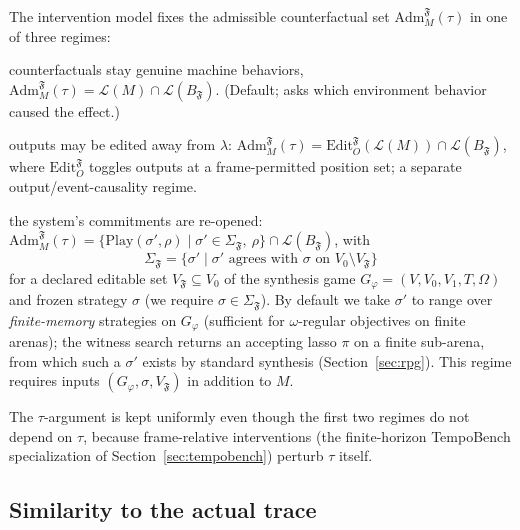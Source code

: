 \documentclass[11pt]{article}
\theoremstyle{remark}
\newcommand{\Lang}{\mathcal{L}}
\newcommand{\Frame}{\mathfrak{F}}
\newcommand{\Adm}{\mathrm{Adm}}
\begin{document}
The intervention model fixes the admissible counterfactual set
\(\Adm_M^{\Frame}(\tau)\) in one of three regimes:
\begin{description}[leftmargin=2.2cm,style=nextline]
  \item[Input-only] counterfactuals stay genuine machine behaviors,
        \(\Adm_M^{\Frame}(\tau)=\Lang(M)\cap\Lang(B_{\Frame})\). (Default; asks
        which environment behavior caused the effect.)
  \item[Output-intervention] outputs may be edited away from \(\lambda\):
        \(\Adm_M^{\Frame}(\tau)=\mathrm{Edit}_O^{\Frame}(\Lang(M))\cap
        \Lang(B_{\Frame})\), where \(\mathrm{Edit}_O^{\Frame}\) toggles outputs at
        a frame-permitted position set; a separate output/event-causality regime.
  \item[Strategy-structure] the system's commitments are re-opened:
        \(\Adm_M^{\Frame}(\tau)=\{\mathrm{Play}(\sigma',\rho)\mid\sigma'\in
        \Sigma_{\Frame},\ \rho\}\cap\Lang(B_{\Frame})\), with
        \[
          \Sigma_{\Frame}=\{\sigma'\mid \sigma'\text{ agrees with }\sigma
          \text{ on }V_0\setminus V_{\Frame}\}
        \]
        for a declared editable set \(V_{\Frame}\subseteq V_0\) of the synthesis
        game \(G_\varphi=(V,V_0,V_1,T,\Omega)\) and frozen strategy \(\sigma\)
        (we require \(\sigma\in\Sigma_{\Frame}\)). By default we take
        \(\sigma'\) to range over \emph{finite-memory} strategies on
        \(G_\varphi\) (sufficient for \(\omega\)-regular objectives on finite
        arenas); the witness search returns an accepting lasso \(\pi\) on a
        finite sub-arena, from which such a \(\sigma'\) exists by standard
        synthesis (Section~\ref{sec:rpg}). This regime requires inputs
        \((G_\varphi,\sigma,V_{\Frame})\) in addition to \(M\).
\end{description}
The \(\tau\)-argument is kept uniformly even though the first two regimes do not
depend on \(\tau\), because frame-relative interventions (the finite-horizon
TempoBench specialization of Section~\ref{sec:tempobench}) perturb \(\tau\) itself.

\subsection{Similarity to the actual trace}
\label{sec:similarity}
\end{document}
